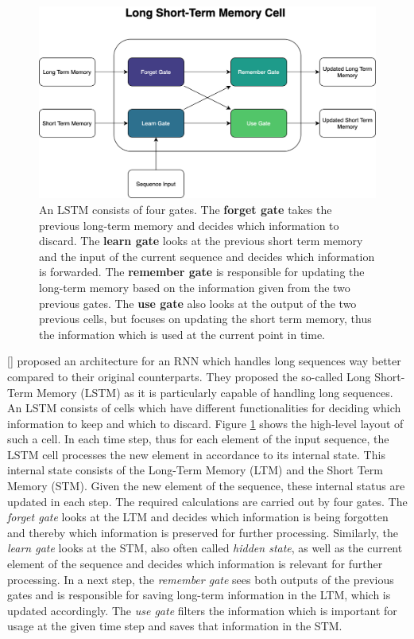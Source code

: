 \documentclass[11pt]{scrartcl}
\begin{document}
\begin{figure}[hbt]
	\center
	\includegraphics[width=1.0\textwidth]{img/general/LSTM.png}
	\caption{An LSTM consists of four gates. The \textcolor{viridis1}{\textbf{forget gate}} takes the previous long-term memory and decides which information to discard. The \textcolor{viridis3}{\textbf{learn gate}} looks at the previous short term memory and the input of the current sequence and decides which information is forwarded. The \textcolor{viridis5}{\textbf{remember gate}} is responsible for updating the long-term memory based on the information given from the two previous gates. The \textcolor{viridis7}{\textbf{use gate}} also looks at the output of the two previous cells, but focuses on updating the short term memory, thus the information which is used at the current point in time.} 
	\label{fig:lstm}
\end{figure}

[\cite{10.1162/neco.1997.9.8.1735}] proposed an architecture for an RNN which handles long sequences way better compared to their original counterparts. They proposed the so-called Long Short-Term Memory (LSTM) as it is particularly capable of handling long sequences. An LSTM consists of cells which have different functionalities for deciding which information to keep and which to discard. Figure \ref{fig:lstm} shows the high-level layout of such a cell. In each time step, thus for each element of the input sequence, the LSTM cell processes the new element in accordance to its internal state. This internal state consists of the Long-Term Memory (LTM) and the Short Term Memory (STM). Given the new element of the sequence, these internal status are updated in each step. The required calculations are carried out by four gates. The \textit{forget gate} looks at the LTM and decides which information is being forgotten and thereby which information is preserved for further processing. Similarly, the \textit{learn gate} looks at the STM, also often called \textit{hidden state}, as well as the current element of the sequence and decides which information is relevant for further processing. In a next step, the \textit{remember gate} sees both outputs of the previous gates and is responsible for saving long-term information in the LTM, which is updated accordingly. The \textit{use gate} filters the information which is important for usage at the given time step and saves that information in the STM.
\end{document}
